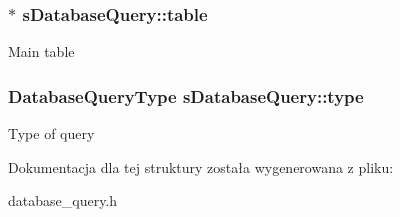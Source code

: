 \subsubsection[{\texorpdfstring{table}{table}}]{$\ast$ s\+Database\+Query\+::table}\hypertarget{structsDatabaseQuery_a8d34ce4ad0e31c1bc8978ec03d4b5fbf}{}\label{structsDatabaseQuery_a8d34ce4ad0e31c1bc8978ec03d4b5fbf}
Main table 
\subsubsection[{\texorpdfstring{type}{type}}]{\setlength{\rightskip}{0pt plus 5cm}Database\+Query\+Type s\+Database\+Query\+::type}\hypertarget{structsDatabaseQuery_a5b7daf6543a0c36ab9b6a2a948f953bb}{}\label{structsDatabaseQuery_a5b7daf6543a0c36ab9b6a2a948f953bb}
Type of query 

Dokumentacja dla tej struktury została wygenerowana z pliku\+:\begin{DoxyCompactItemize}
\item 
database\+\_\+query.\+h\end{DoxyCompactItemize}
